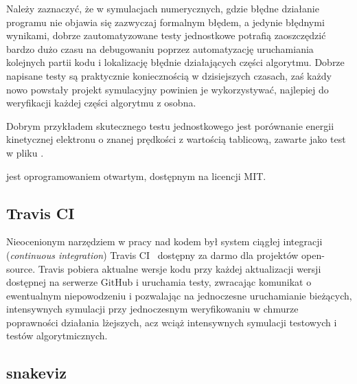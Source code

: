 Należy zaznaczyć, że w symulacjach numerycznych, gdzie błędne działanie programu nie
objawia się zazwyczaj formalnym błędem, a jedynie błędnymi
wynikami, dobrze zautomatyzowane testy jednostkowe potrafią zaoszczędzić
bardzo dużo czasu na debugowaniu poprzez automatyzację uruchamiania
kolejnych partii kodu i lokalizację błędnie działających części algorytmu.
Dobrze napisane testy są praktycznie koniecznością w dzisiejszych czasach,
zaś każdy nowo powstały projekt symulacyjny powinien je
wykorzystywać, najlepiej do weryfikacji każdej części algorytmu z osobna.

Dobrym przykładem skutecznego testu jednostkowego jest porównanie energii kinetycznej
elektronu o znanej prędkości z wartością tablicową, zawarte jako test w pliku
.

 jest oprogramowaniem otwartym, dostępnym na licencji MIT\@.

\subsection{Travis CI}
Nieocenionym narzędziem w pracy nad kodem był system ciągłej integracji
(\emph{continuous integration}) Travis CI~\cite{travisci}
dostępny za
darmo dla projektów open-source. Travis pobiera aktualne wersje kodu przy
każdej aktualizacji wersji dostępnej na serwerze GitHub i uruchamia testy,
zwracając komunikat o ewentualnym niepowodzeniu i pozwalając na jednoczesne
uruchamianie bieżących, intensywnych symulacji przy jednoczesnym
weryfikowaniu w chmurze poprawności działania lżejszych, acz wciąż intensywnych
symulacji testowych i testów algorytmicznych.

\subsection{snakeviz}

